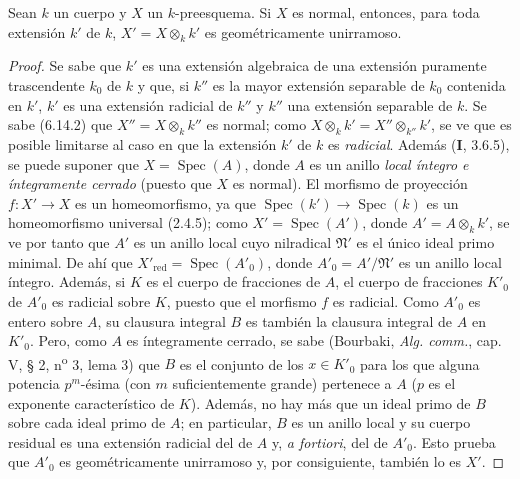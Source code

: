 \begin{proposition}[6.15.6]
\label{IV.2.s6.15.6-fr}
Sean $k$ un cuerpo y $X$ un $k$-preesquema. Si $X$ es normal,
entonces, para toda extensión $k'$ de $k$,
$X'=X\otimes_k k'$ es geométricamente unirramoso.
\end{proposition}

\begin{proof}
Se sabe que $k'$ es una extensión algebraica de una extensión
puramente trascendente $k_0$ de $k$ y que, si $k''$ es la mayor
extensión separable de $k_0$ contenida en $k'$, $k'$ es una
extensión radicial de $k''$ y $k''$ una extensión separable de
$k$. Se sabe (6.14.2) que $X''=X\otimes_k k''$ es normal; como
$X\otimes_k k'=X''\otimes_{k''}k'$, se ve que es posible limitarse al caso
en que la extensión $k'$ de $k$ es \emph{radicial}. Además (\textbf I, 3.6.5),
se puede suponer que $X=\operatorname{Spec}(A)$, donde $A$ es un
anillo \emph{local íntegro e íntegramente cerrado} (puesto que $X$
es normal). El morfismo de proyección $f:X'\to X$ es un
homeomorfismo, ya que
$\operatorname{Spec}(k')\to\operatorname{Spec}(k)$ es un
homeomorfismo universal (2.4.5); como
$X'=\operatorname{Spec}(A')$, donde $A'=A\otimes_k k'$, se ve
por tanto que $A'$ es un anillo local cuyo nilradical
$\mathfrak N'$ es el único ideal primo minimal. De ahí que
$X'_{\mathrm{red}}=\operatorname{Spec}(A'_0)$, donde
$A'_0=A'/\mathfrak N'$ es un anillo local íntegro. Además, si
$K$ es el cuerpo de fracciones de $A$, el cuerpo de fracciones
$K'_0$ de $A'_0$ es radicial sobre $K$, puesto que el morfismo
$f$ es radicial. Como $A'_0$ es entero sobre $A$, su clausura
integral $B$ es también la clausura integral de $A$ en $K'_0$.
Pero, como $A$ es íntegramente cerrado, se sabe (Bourbaki,
\emph{Alg. comm.}, cap. V, § 2, n\textsuperscript{o} 3, lema 3) que $B$ es el
conjunto de los $x\in K'_0$ para los que alguna potencia
$p^m$-ésima (con $m$ suficientemente grande) pertenece a $A$
($p$ es el exponente característico de $K$). Además, no hay
más que un ideal primo de $B$ sobre cada ideal primo de $A$; en
particular, $B$ es un anillo local y su cuerpo residual es una
extensión radicial del de $A$ y, \emph{a fortiori}, del de
$A'_0$. Esto prueba que $A'_0$ es geométricamente unirramoso
y, por consiguiente, también lo es $X'$.
\end{proof}
